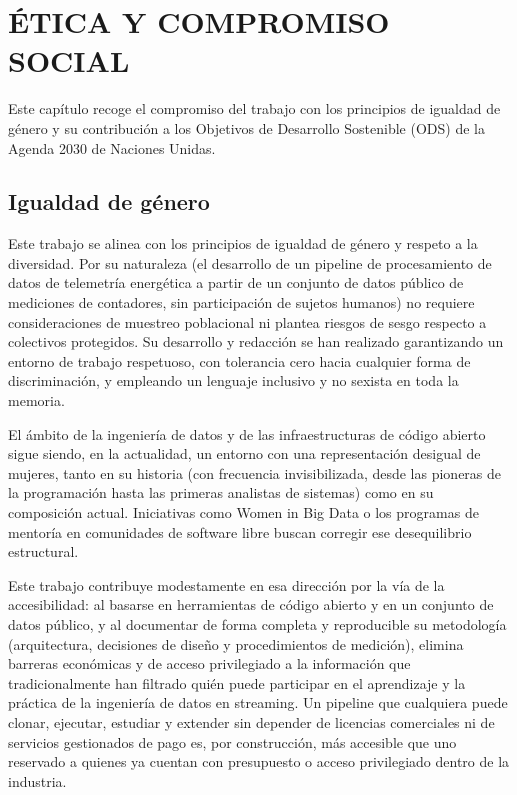 \chapter{ÉTICA Y COMPROMISO SOCIAL}

Este capítulo recoge el compromiso del trabajo con los principios de igualdad de género y su contribución a los Objetivos de Desarrollo Sostenible (ODS) de la Agenda 2030 de Naciones Unidas.

\section{Igualdad de género}

Este trabajo se alinea con los principios de igualdad de género y respeto a la diversidad. Por su naturaleza (el desarrollo de un pipeline de procesamiento de datos de telemetría energética a partir de un conjunto de datos público de mediciones de contadores, sin participación de sujetos humanos) no requiere consideraciones de muestreo poblacional ni plantea riesgos de sesgo respecto a colectivos protegidos. Su desarrollo y redacción se han realizado garantizando un entorno de trabajo respetuoso, con tolerancia cero hacia cualquier forma de discriminación, y empleando un lenguaje inclusivo y no sexista en toda la memoria.

El ámbito de la ingeniería de datos y de las infraestructuras de código abierto sigue siendo, en la actualidad, un entorno con una representación desigual de mujeres, tanto en su historia (con frecuencia invisibilizada, desde las pioneras de la programación hasta las primeras analistas de sistemas) como en su composición actual. Iniciativas como Women in Big Data o los programas de mentoría en comunidades de software libre buscan corregir ese desequilibrio estructural.

Este trabajo contribuye modestamente en esa dirección por la vía de la accesibilidad: al basarse en herramientas de código abierto y en un conjunto de datos público, y al documentar de forma completa y reproducible su metodología (arquitectura, decisiones de diseño y procedimientos de medición), elimina barreras económicas y de acceso privilegiado a la información que tradicionalmente han filtrado quién puede participar en el aprendizaje y la práctica de la ingeniería de datos en streaming. Un pipeline que cualquiera puede clonar, ejecutar, estudiar y extender sin depender de licencias comerciales ni de servicios gestionados de pago es, por construcción, más accesible que uno reservado a quienes ya cuentan con presupuesto o acceso privilegiado dentro de la industria.


